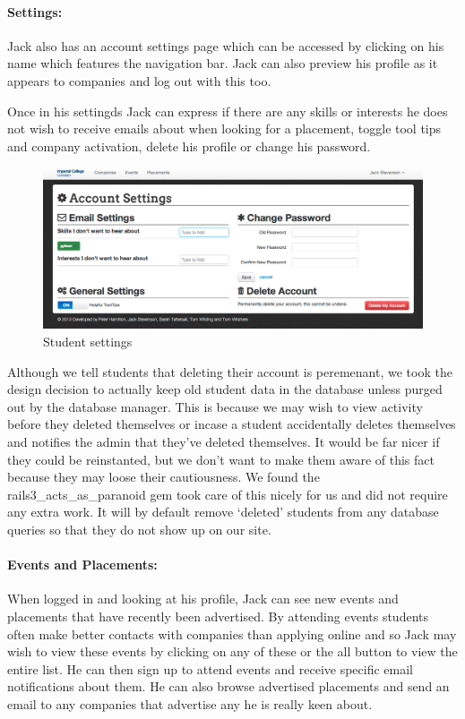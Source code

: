   \paragraph{Settings:}
    Jack also has an account settings page which can be accessed by clicking on his name which features the navigation bar. Jack can also preview his profile as it appears to companies and log out with this too. 

    Once in his settingds Jack can express if there are any skills or interests he does not wish to receive emails about when looking for a placement, toggle tool tips and company activation, delete his profile or change his password.

    \begin{figure}[H]\centering
    \includegraphics[scale=0.3]{images/user_experiences/student/account_settings}
    \caption{Student settings}
    \end{figure}

    Although we tell students that deleting their account is peremenant, we took the design decision to actually keep old student data in the database unless purged out by the database manager. This is because we may wish to view activity before they deleted themselves or incase a student accidentally deletes themselves and notifies the admin that they've deleted themselves. It would be far nicer if they could be reinstanted, but we don't want to make them aware of this fact because they may loose their cautiousness. We found the rails3\_acts\_as\_paranoid\cite{paranoid_gem} gem took care of this nicely for us and did not require any extra work. It will by default remove `deleted' students from any database queries so that they do not show up on our site.

  \paragraph{Events and Placements:}
    When logged in and looking at his profile, Jack can see new events and placements that have recently been advertised. By attending events students often make better contacts with companies than applying online and so Jack may wish to view these events by clicking on any of these or the all button to view the entire list. He can then sign up to attend events and receive specific email notifications about them.
    He can also browse advertised placements and send an email to any companies that advertise any he is really keen about.

